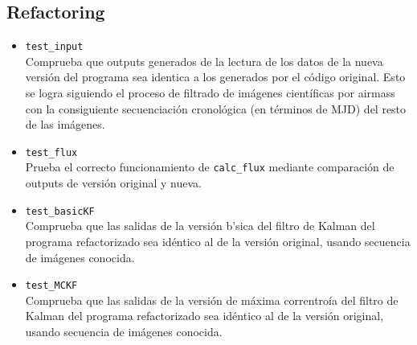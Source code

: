 \begin{appendix}
\subsection{Refactoring}
\begin{itemize}
\item \texttt{test\_input}\\
Comprueba que outputs generados de la lectura de los datos de la nueva versi\'on del programa sea identica a los generados por el c\'odigo original. Esto se logra siguiendo el proceso de filtrado de im\'agenes cient\'ificas por airmass con la consiguiente secuenciaci\'on cronol\'ogica (en t\'erminos de MJD) del resto de las im\'agenes.
\item \texttt{test\_flux}\\
Prueba el correcto funcionamiento de \texttt{calc\_flux} mediante comparaci\'on de outputs de versi\'on original y nueva.
\item \texttt{test\_basicKF}\\
Comprueba que las salidas de la versi\'on b\a'sica del filtro de Kalman del programa refactorizado sea id\'entico al de la versi\'on original, usando secuencia de im\'agenes conocida.
\item \texttt{test\_MCKF}\\
Comprueba que las salidas de la versi\'on de m\'axima correntro\'ia  del filtro de Kalman del programa refactorizado sea id\'entico al de la versi\'on original, usando secuencia de im\'agenes conocida.
\end{itemize}
\pagebreak


\end{appendix}
